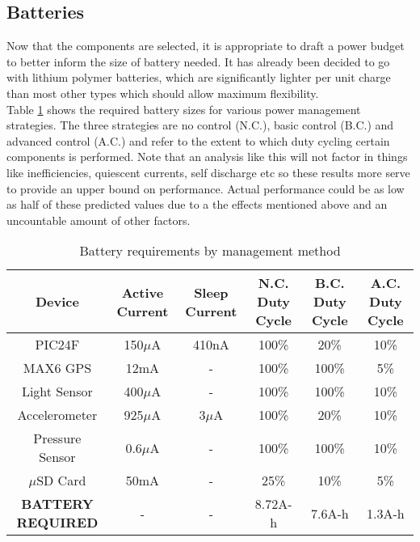 \documentclass[12pt,openany,a4paper]{book}
\begin{document}
		\subsection{Batteries}
		Now that the components are selected, it is appropriate to draft a power budget to better inform the size of battery needed. It has already been decided to go with lithium polymer batteries, which are significantly lighter per unit charge than most other types which should allow maximum flexibility. \\
		
		Table \ref{tab:PWR} shows the required battery sizes for various power management strategies. The three strategies are no control (N.C.), basic control (B.C.) and advanced control (A.C.) and refer to the extent to which duty cycling certain components is performed. Note that an analysis like this will not factor in things like inefficiencies, quiescent currents,  self discharge etc so these results more serve to provide an upper bound on performance. Actual performance could be as low as half of these predicted values due to a the effects mentioned above and an uncountable amount of other factors.\\ %
		
		\begin{table}[H]
			\centering
			\begin{adjustbox}{max width=\textwidth}
				\begin{tabular}{c | c | c | c | c | c }
					Device & Active Current & Sleep Current & N.C. Duty Cycle & B.C. Duty Cycle & A.C. Duty Cycle\\
					\hline
					PIC24F          & 150$\mu$A & 410nA  & 100\% & 20\%  & 10\%  \\
					MAX6 GPS        & 12mA      & -      & 100\% & 100\% & 5\%   \\
					Light Sensor    & 400$\mu$A & -      & 100\% & 100\% & 10\%  \\
					Accelerometer   & 925$\mu$A & 3$\mu$A& 100\% & 20\%  & 10\%  \\
					Pressure Sensor & 0.6$\mu$A & -      & 100\% & 100\% & 10\%  \\
					$\mu$SD Card    & 50mA      & -      & 25\%  & 10\%  & 5\%   \\
					\hline
					\bf BATTERY REQUIRED & - & - & 8.72A-h & 7.6A-h & 1.3A-h\\
				\end{tabular}
			\end{adjustbox}
			\caption{Battery requirements by management method}
			\label{tab:PWR}
		\end{table}		
		
\end{document}

